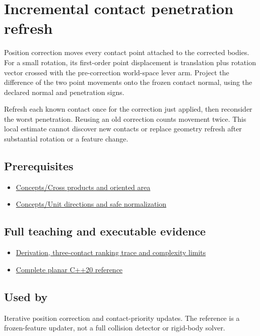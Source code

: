 \hypertarget{appendix-f682275acbdf}{}\label{referencestart:appendix-f682275acbdf}
\section{Incremental contact penetration refresh}\label{appendix-f682275acbdf-incremental-contact-penetration-refresh}

\hypertarget{appendix-f682275acbdf-incremental-contact-penetration-refresh}{}

Position correction moves every contact point attached to the corrected bodies. For a small rotation, its first-order point displacement is translation plus rotation vector crossed with the pre-correction world-space lever arm. Project the difference of the two point movements onto the frozen contact normal, using the declared normal and penetration signs.

Refresh each known contact once for the correction just applied, then reconsider the worst penetration. Reusing an old correction counts movement twice. This local estimate cannot discover new contacts or replace geometry refresh after substantial rotation or a feature change.

\subsection{Prerequisites}\label{appendix-f682275acbdf-prerequisites}

\hypertarget{appendix-f682275acbdf-prerequisites}{}

\begin{itemize}
\tightlist
\item
  \hyperref[appendix-2391db8052b1]{Concepts/Cross products and oriented area}
\item
  \hyperref[appendix-f744e41b95b4]{Concepts/Unit directions and safe normalization}
\end{itemize}

\subsection{Full teaching and executable evidence}\label{appendix-f682275acbdf-full-teaching-and-executable-evidence}

\hypertarget{appendix-f682275acbdf-full-teaching-and-executable-evidence}{}

\begin{itemize}
\tightlist
\item
  \hyperref[06-engine-ii-ch046-refresh-neighboring-penetrations-after-position-correction]{Derivation, three-contact ranking trace and complexity limits}
\item
  \hyperref[06-engine-ii-ch046-a-planar-penetration-refresh-witness]{Complete planar C++20 reference}
\end{itemize}

\subsection{Used by}\label{appendix-f682275acbdf-used-by}

\hypertarget{appendix-f682275acbdf-used-by}{}

Iterative position correction and contact-priority updates. The reference is a frozen-feature updater, not a full collision detector or rigid-body solver.
